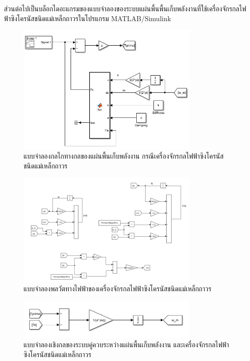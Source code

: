 \documentclass[11pt,a4paper]{article}
\begin{document}
ส่วนต่อไปเป็นบล็อกไดอะแกรมของแบบจำลองของระบบแผ่นพื้นพื้นเก็บพลังงานที่ใช้เครื่องจักรกลไฟฟ้าซิงโครนัสชนิดแม่เหล็กถาวรในโปรแกรม MATLAB/Simulink
\begin{figure}[H]
    \centering
    \includegraphics[width=0.8\textwidth]{mech_model_ac.png}
    \caption{แบบจำลองกลไกทางกลของแผ่นพื้นเก็บพลังงาน กรณีเครื่องจักรกลไฟฟ้าซิงโครนัสชนิดแม่เหล็กถาวร}
\end{figure}
\begin{figure}[H]
    \centering
    \includegraphics[width=0.8\textwidth]{elec_model_ac.png}
    \caption{แบบจำลองพลวัตทางไฟฟ้าของเครื่องจักรกลไฟฟ้าซิงโครนัสชนิดแม่เหล็กถาวร}
\end{figure}
\begin{figure}[H]
    \centering
    \includegraphics[width=0.8\textwidth]{mech_ac_coupling_model.png}
    \caption{แบบจำลองเชิงกลของระบบคู่ควบระหว่างแผ่นพื้นเก็บพลังงาน และเครื่องจักรกลไฟฟ้าซิงโครนัสชนิดแม่เหล็กถาวร}
\end{figure}
\end{document}
